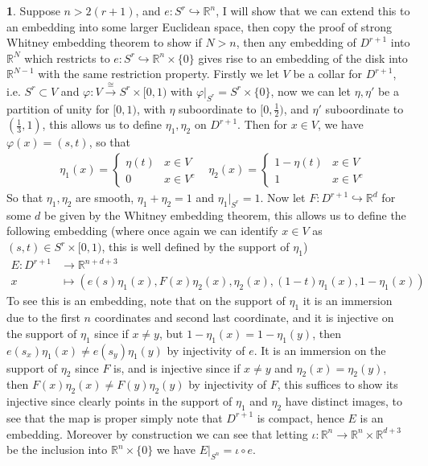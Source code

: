 \documentclass[10.5pt]{article}
\theoremstyle{definition}
\newtheorem{pb}{}
\newcommand{\set}[1]{\{#1\}}
\begin{document}
    \begin{pb}
        Suppose \(n > 2(r+1)\), and \(e: S^r \hookrightarrow \mathbb{R}^n\), I will show that we can extend this to an embedding into some larger Euclidean space, then copy the proof of strong Whitney embedding theorem to show if \(N > n\), then any embedding of \(D^{r+1}\) into \(\mathbb{R}^N\) which restricts to \(e: S^r \hookrightarrow \mathbb{R}^n \times \set{0}\) gives rise to an embedding of the disk into \(\mathbb{R}^{N-1}\) with the same restriction property. Firstly we let \(V\) be a collar for \(D^{r+1}\), i.e. \(S^r \subset V\) and \(\varphi: V \overset{\cong}{\to} S^{r} \times [0,1)\) with \(\varphi\vert_{S^r} = S^r \times \set{0}\), now we can let \(\eta, \eta'\) be a partition of unity for \([0,1)\), with \(\eta\) suboordinate to \([0,\frac12)\), and \(\eta'\) suboordinate to \((\frac13,1)\), this allows us to define \(\eta_1, \eta_2\) on \(D^{r+1}\). Then for \(x \in V\), we have \(\varphi(x) = (s,t)\), so that
        \begin{align*}
            &\eta_1(x) = \begin{cases}
                \eta(t) & x \in V \\ 0 & x \in V^c
            \end{cases}
            &\eta_2(x) = \begin{cases}
                1 - \eta(t) & x \in V \\
                1 & x \in V^c
            \end{cases}
        \end{align*}
        So that \(\eta_1,\eta_2\) are smooth, \(\eta_1 + \eta_2 = 1\) and \(\eta_1\vert_{S^r} = 1\). Now let \(F: D^{r+1} \hookrightarrow \mathbb{R}^d\) for some \(d\) be given by the Whitney embedding theorem, this allows us to define the following embedding (where once again we can identify \(x \in V\) as \((s,t) \in S^r\times[0,1)\), this is well defined by the support of \(\eta_1\))
        \begin{align*}
            E: D^{r+1} &\to \mathbb{R}^{n + d + 3} \\
            x &\mapsto (e(s)\eta_1(x),F(x)\eta_2(x),\eta_2(x),(1-t)\eta_1(x), 1 - \eta_1(x))
        \end{align*}
        To see this is an embedding, note that on the support of \(\eta_1\) it is an immersion due to the first \(n\) coordinates and second last coordinate, and it is injective on the support of \(\eta_1\) since if \(x \neq y\), but \(1 - \eta_1(x) = 1 - \eta_1(y)\), then \(e(s_x)\eta_1(x) \neq e(s_y)\eta_1(y)\) by injectivity of \(e\). It is an immersion on the support of \(\eta_2\) since \(F\) is, and is injective since if \(x \neq y\) and \(\eta_2(x) = \eta_2(y)\), then \(F(x)\eta_2(x) \neq F(y)\eta_2(y)\) by injectivity of \(F\), this suffices to show its injective since clearly points in the support of \(\eta_1\) and \(\eta_2\) have distinct images, to see that the map is proper simply note that \(D^{r+1}\) is compact, hence \(E\) is an embedding. Moreover by construction we can see that letting \(\iota: \mathbb{R}^n \to \mathbb{R}^n\times \mathbb{R}^{d+3}\) be the inclusion into \(\mathbb{R}^n \times \set{0}\) we have \(E\vert_{S^n} = \iota \circ e\).
        

\end{pb}
\end{document}
